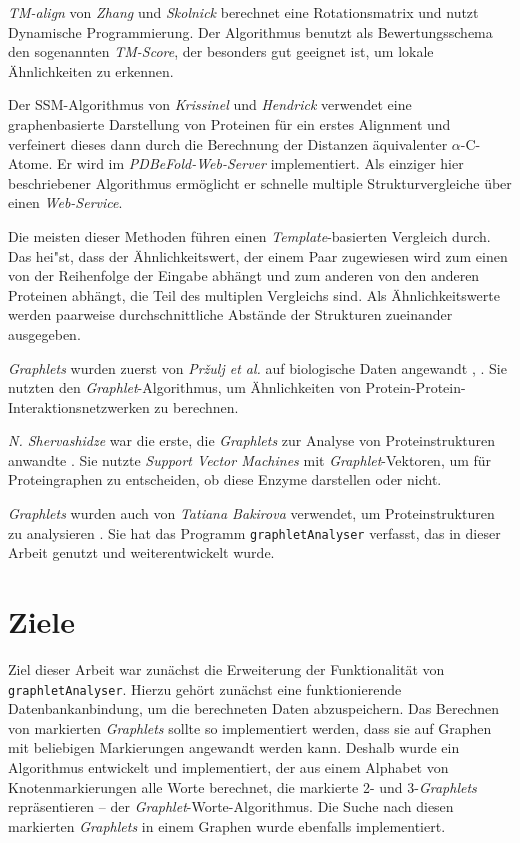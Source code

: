 \documentclass{report}
\begin{document}
\textit{TM-align} von \textit{Zhang} und \textit{Skolnick} \cite{zhangtm} berechnet eine Rotationsmatrix und nutzt Dynamische Programmierung. Der Algorithmus benutzt als Bewertungsschema den sogenannten \textit{TM-Score}, der besonders gut geeignet ist, um lokale \"Ahnlichkeiten zu erkennen.

Der SSM-Algorithmus von \textit{Krissinel} und \textit{Hendrick} \cite{pdbefold} verwendet eine graphenbasierte Darstellung von Proteinen f\"ur ein erstes Alignment und verfeinert dieses dann durch die Berechnung der Distanzen \"aquivalenter $\alpha$-C-Atome. Er wird im \textit{PDBeFold-Web-Server} implementiert. Als einziger hier beschriebener Algorithmus erm\"oglicht er schnelle multiple Strukturvergleiche \"uber einen \textit{Web-Service}.


Die meisten dieser Methoden f\"uhren einen \textit{Template}-basierten Vergleich durch. Das hei"st, dass der \"Ahnlichkeitswert, der einem Paar zugewiesen wird zum einen von der Reihenfolge der Eingabe abh\"angt und zum anderen von den anderen Proteinen abh\"angt, die Teil des multiplen Vergleichs sind.
Als \"Ahnlichkeitswerte werden paarweise durchschnittliche Abst\"ande der Strukturen zueinander ausgegeben.

\textit{Graphlets} wurden zuerst von \textit{Pr{\v z}ulj et al.} auf biologische Daten angewandt \cite{frqdistribution}, \cite{graphletfrequency}. Sie nutzten den \textit{Graphlet}-Algorithmus, um \"Ahnlichkeiten von Protein-Protein-Interaktionsnetzwerken zu berechnen.

\textit{N. Shervashidze} war die erste, die \textit{Graphlets} zur Analyse von Proteinstrukturen anwandte \cite{sherv_graphlets}. Sie nutzte \textit{Support Vector Machines} mit \textit{Graphlet}-Vektoren, um  f\"ur Proteingraphen zu entscheiden, ob diese Enzyme darstellen oder nicht.

\textit{Graphlets} wurden auch von \textit{Tatiana Bakirova} verwendet, um Proteinstrukturen zu analysieren \cite{bakirova2013comparison}. Sie hat das Programm \texttt{graphletAnalyser} verfasst, das in dieser Arbeit genutzt und weiterentwickelt wurde.

\section{Ziele}

Ziel dieser Arbeit war zun\"achst die Erweiterung der Funktionalit\"at von \\ \texttt{graphletAnalyser}. Hierzu geh\"ort zun\"achst eine funktionierende Datenbankanbindung, um die berechneten Daten abzuspeichern.
Das Berechnen von markierten \textit{Graphlets} sollte so implementiert werden, dass sie auf Graphen mit beliebigen Markierungen angewandt werden kann. Deshalb wurde ein Algorithmus entwickelt und implementiert, der aus einem Alphabet von Knotenmarkierungen alle Worte berechnet, die markierte  2- und 3-\textit{Graphlets} repr\"asentieren -- der \textit{Graphlet}-Worte-Algorithmus. Die Suche nach diesen markierten \textit{Graphlets} in einem Graphen wurde ebenfalls implementiert.
\end{document}
